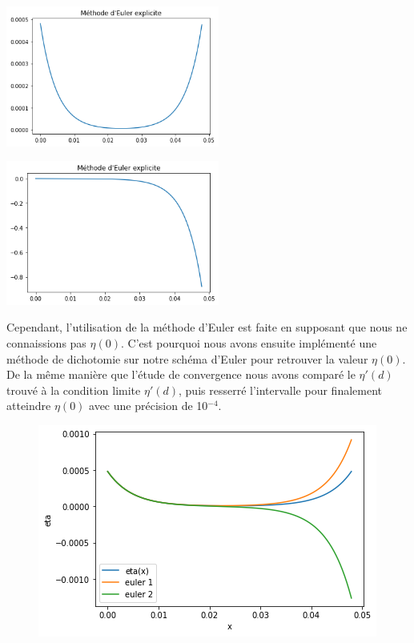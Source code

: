 \documentclass[10pt,a4paper]{article}
\begin{document}
\newline\newline
\begin{minipage}[c]{.46\linewidth}
     \begin{center}
             \includegraphics[width=7cm]{Euler_eta0.png}
	     \label{fig14_1}
         \end{center}
   \end{minipage} \hfill
   \begin{minipage}[c]{.46\linewidth}
    \begin{center}
            \includegraphics[width=7cm]{Euler_1.png}
        \end{center}
 \end{minipage}
\vspace{1cm}

Cependant, l'utilisation de la méthode d'Euler est faite en supposant que nous ne connaissions pas $\eta(0)$.
\newline
C'est pourquoi nous avons ensuite implémenté une méthode de dichotomie sur notre schéma d'Euler pour retrouver la valeur $\eta(0)$. De la même manière que l'étude de convergence nous avons comparé le $\eta'(d)$ trouvé à la condition limite $\eta'(d)$, puis resserré l'intervalle pour finalement atteindre $\eta(0)$ avec une précision de 10$^{-4}$.

\begin{figure}[h]
	\centering
    \includegraphics[width=.5\linewidth]{errreur.png}
    
\end{figure}
\end{document}
